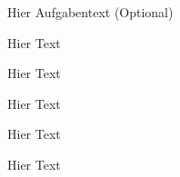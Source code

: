 \tbd 
\begin{frage}
Hier Aufgabentext (Optional)
\end{frage}
Hier Text

\teil
Hier Text


\teil
Hier Text

\subteil
Hier Text

\subteil
Hier Text